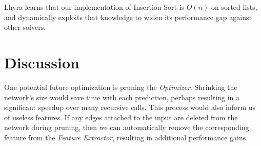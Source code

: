 \documentclass{article}
\begin{document}
\begin{figure}[!ht]
    \centering
    \begin{floatrow}
      
    \end{floatrow}
\end{figure}

Lhyra learns that our implementation of Insertion Sort is $O(n)$ on sorted lists, and dynamically exploits that knowledge to widen its performance gap against other solvers.

\section{Discussion}

One potential future optimization is pruning the \textit{Optimizer}. Shrinking the network's size would save time with each prediction, perhaps resulting in a significant speedup over many recursive calls. This process would also inform us of useless features. If any edges attached to the input are deleted from the network during pruning, then we can automatically remove the corresponding feature from the \textit{Feature Extractor}, resulting in additional performance gains.
\end{document}

